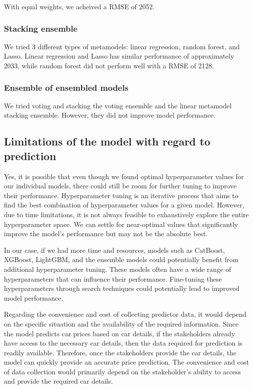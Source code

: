 \documentclass[
  letterpaper,
  DIV=11,
  numbers=noendperiod]{scrartcl}
\begin{document}
With equal weights, we acheived a RMSE of 2052.

\hypertarget{stacking-ensemble}{%
\subsubsection{Stacking ensemble}\label{stacking-ensemble}}

We tried 3 different types of metamodels: linear regression, random
forest, and Lasso. Linear regression and Lasso has similar performance
of approximately 2033, while random forest did not perform well with a
RMSE of 2128.

\hypertarget{ensemble-of-ensembled-models}{%
\subsubsection{Ensemble of ensembled
models}\label{ensemble-of-ensembled-models}}

We tried voting and stacking the voting ensemble and the linear
metamodel stacking ensemble. However, they did not improve model
performance.

\hypertarget{limitations-of-the-model-with-regard-to-prediction}{%
\subsection{Limitations of the model with regard to
prediction}\label{limitations-of-the-model-with-regard-to-prediction}}

Yes, it is possible that even though we found optimal hyperparameter
values for our individual models, there could still be room for further
tuning to improve their performance. Hyperparameter tuning is an
iterative process that aims to find the best combination of
hyperparameter values for a given model. However, due to time
limitations, it is not always feasible to exhaustively explore the
entire hyperparameter space. We can settle for near-optimal values that
significantly improve the model's performance but may not be the
absolute best.

In our case, if we had more time and resources, models such as CatBoost,
XGBoost, LightGBM, and the ensemble models could potentially benefit
from additional hyperparameter tuning. These models often have a wide
range of hyperparameters that can influence their performance.
Fine-tuning these hyperparameters through search techniques could
potentially lead to improved model performance.

Regarding the convenience and cost of collecting predictor data, it
would depend on the specific situation and the availability of the
required information. Since the model predicts car prices based on car
details, if the stakeholders already have access to the necessary car
details, then the data required for prediction is readily available.
Therefore, once the stakeholders provide the car details, the model can
quickly provide an accurate price prediction. The convenience and cost
of data collection would primarily depend on the stakeholder's ability
to access and provide the required car details.
\end{document}
